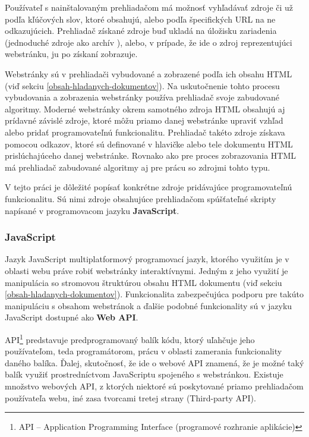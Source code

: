 Používateľ s nainštalovaným prehliadačom má možnosť vyhľadávať zdroje či už podľa 
kľúčových slov, ktoré obsahujú, alebo podľa špecifických URL na ne odkazujúcich.
Prehliadač získané zdroje buď ukladá na úložisku zariadenia (jednoduché zdroje ako archív ), alebo, v prípade, že ide o zdroj reprezentujúci webstránku, ju po získaní zobrazuje.  

Webstránky sú v prehliadači vybudované a zobrazené podľa ich obsahu HTML (viď sekciu \ref{obsah-hladanych-dokumentov}).
Na uskutočnenie tohto procesu vybudovania a zobrazenia webstránky používa prehliadač svoje zabudované algoritmy.
Moderné webstránky okrem samotného zdroja HTML obsahujú aj prídavné závislé zdroje, ktoré môžu priamo danej webstránke upraviť vzhľad alebo pridať programovateľnú funkcionalitu.
Prehliadač takéto zdroje získava pomocou odkazov, ktoré sú definované v hlavičke alebo tele dokumentu HTML prislúchajúceho danej webstránke.
Rovnako ako pre proces zobrazovania HTML má prehliadač zabudované algoritmy aj pre prácu so zdrojmi tohto typu.

V tejto práci je dôležité popísať konkrétne zdroje pridávajúce programovateľnú funkcionalitu.
Sú nimi zdroje obsahujúce prehliadačom spúšťateľné skripty napísané v programovacom jazyku \textbf{JavaScript}.

\subsubsection{JavaScript}
\label{javascript}

Jazyk JavaScript multiplatformový programovací jazyk, ktorého využitím je v oblasti webu práve robiť webstránky interaktívnymi. 
Jedným z jeho využití je manipulácia so stromovou štruktúrou obsahu HTML dokumentu (viď sekciu \ref{obsah-hladanych-dokumentov}).
Funkcionalita zabezpečujúca podporu pre takúto manipuláciu s obsahom webstránok a ďalšie podobné funkcionality sú v jazyku JavaScript dostupné ako \textbf{Web API}.

API\footnote{API -- Application Programming Interface (programové rozhranie aplikácie)} predstavuje predprogramovaný balík kódu, ktorý uľahčuje jeho používateľom, teda programátorom, prácu v oblasti zamerania funkcionality daného balíka.
Ďalej, skutočnosť, že ide o webové API znamená, že je možné taký balík využiť prostredníctvom JavaScriptu spojeného s webstránkou.
Existuje množstvo webových API, z ktorých niektoré sú poskytované priamo prehliadačom používateľa webu, iné zasa tvorcami tretej strany (Third-party API).

